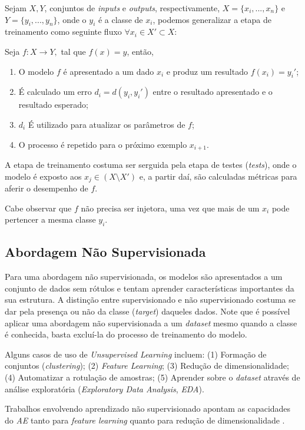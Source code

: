 Sejam $X, Y$, conjuntos de \textit{inputs} e \textit{outputs}, respectivamente, $X=\{x_i, ..., x_n\}$ e $Y=\{y_i, ..., y_n\}$, onde o $y_i$ é a classe de $x_i$, podemos generalizar a etapa de treinamento como seguinte fluxo $\forall x_i \in X' \subset X$:

Seja $f: X \rightarrow Y,$ tal que $f(x) = y$, então,

\begin{enumerate}
    \item O modelo $f$ é apresentado a um dado $x_i$ e produz um resultado $f(x_i) = y_i'$;
    \item É calculado um erro $d_i = d(y_i, y_i')$ entre o resultado apresentado e o resultado esperado;
    \item $d_i$ É utilizado para atualizar os parâmetros de $f$;
    \item O processo é repetido para o próximo exemplo $x_{i+1}$.
\end{enumerate}

A etapa de treinamento costuma ser serguida pela etapa de testes (\textit{tests}), onde o modelo é exposto aos $x_j \in (X \setminus X')$ e, a partir daí, são calculadas métricas para aferir o desempenho de $f$.

Cabe observar que $f$ não precisa ser injetora, uma vez que mais de um $x_i$ pode pertencer a mesma classe $y_i$.

\subsection{Abordagem Não Supervisionada}

Para uma abordagem não supervisionada, os modelos são apresentados a um conjunto de dados sem rótulos e tentam aprender características importantes da sua estrutura. A distinção entre supervisionado e não supervisionado costuma se dar pela presença ou não da classe (\textit{target}) daqueles dados. Note que é possível aplicar uma abordagem não supervisionada a um \textit{dataset} mesmo quando a classe é conhecida, basta excluí-la do processo de treinamento do modelo.

Alguns casos de uso de \textit{Unsupervised Learning} incluem: (1) Formação de conjuntos (\textit{clustering}); (2) \textit{Feature Learning}; (3) Redução de dimensionalidade; (4) Automatizar a rotulação de amostras; (5) Aprender sobre o \textit{dataset} através de análise exploratória (\textit{Exploratory Data Analysis}, \textit{EDA}).

Trabalhos envolvendo aprendizado não supervisionado apontam as capacidades do \textit{AE} tanto para \textit{feature learning} \cite{35.16} \cite{35.17} quanto para redução de dimensionalidade \cite{35.18} \cite{35.19}.

